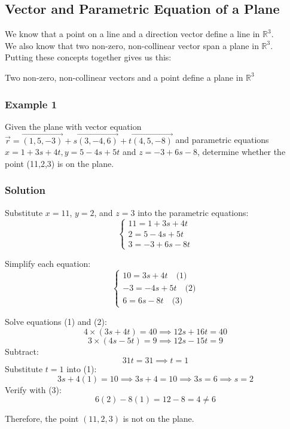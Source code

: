 \documentclass{article}
\begin{document}
\subsection{Vector and Parametric Equation of a Plane}
We know that a point on a line and a direction vector define a line in $\mathbb{R}^3$.\\
We also know that two non-zero, non-collinear vector span a plane in $\mathbb{R}^3$.\\
Putting these concepts together gives us this:

\begin{tcolorbox}[colback=red!5!snow, colframe=red!50!white,
  colbacktitle=red!75!mistyrose]
Two non-zero, non-collinear vectors and a point define a plane in $\mathbb{R}^3$  
\end{tcolorbox}
\subsubsection*{Example 1}
Given the plane with vector equation 
$\vec{r}=\overrightarrow{(1,5,-3)}+s\overrightarrow{(3,-4,6)}+t\overrightarrow{(4,5,-8)}$ and parametric equations $x=1+3s+4t, y=5-4s+5t$ and $z=-3+6s-8$, determine whether the point (11,2,3) is on the plane.
\subsubsection*{Solution}
Substitute \(x = 11\), \(y = 2\), and \(z = 3\) into the parametric equations:
\[
\begin{cases}
11 = 1 + 3s + 4t \\
2 = 5 - 4s + 5t \\
3 = -3 + 6s - 8t
\end{cases}
\]

Simplify each equation:
\[
\begin{cases}
10 = 3s + 4t \quad \text{(1)} \\
-3 = -4s + 5t \quad \text{(2)} \\
6 = 6s - 8t \quad \text{(3)}
\end{cases}
\]

Solve equations (1) and (2):
\[
4 \times (3s + 4t) = 40 \implies 12s + 16t = 40
\]
\[
3 \times (4s - 5t) = 9 \implies 12s - 15t = 9
\]
Subtract:
\[
31t = 31 \implies t = 1
\]
Substitute \(t = 1\) into (1):
\[
3s + 4(1) = 10 \implies 3s + 4 = 10 \implies 3s = 6 \implies s = 2
\]
Verify with (3):
\[
6(2) - 8(1) = 12 - 8 = 4 \neq 6
\]

Therefore, the point \((11, 2, 3)\) is not on the plane.
\end{document}
